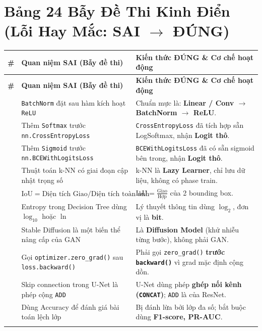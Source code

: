 \documentclass[10pt,a4paper]{article}
\begin{document}
\section{Bảng 24 Bẫy Đề Thi Kinh Điển (Lỗi Hay Mắc: SAI $\to$ ĐÚNG)}

\begin{xltabular}{\textwidth}{lp{6.2cm}X}
\toprule
\textbf{\#} & \textbf{Quan niệm SAI (Bẫy đề thi)} & \textbf{Kiến thức ĐÚNG \& Cơ chế hoạt động} \\
\midrule
\endfirsthead
\toprule
\textbf{\#} & \textbf{Quan niệm SAI (Bẫy đề thi)} & \textbf{Kiến thức ĐÚNG \& Cơ chế hoạt động} \\
\midrule
\endhead
\bottomrule
{} & \texttt{BatchNorm} đặt sau hàm kích hoạt \texttt{ReLU} & Chuẩn mực là: \textbf{Linear / Conv $\to$ BatchNorm $\to$ ReLU}. \\  & Thêm \texttt{Softmax} trước \texttt{nn.CrossEntropyLoss} & \texttt{CrossEntropyLoss} đã tích hợp sẵn LogSoftmax, nhận \textbf{Logit thô}. \\  & Thêm \texttt{Sigmoid} trước \texttt{nn.BCEWithLogitsLoss} & \texttt{BCEWithLogitsLoss} đã có sẵn sigmoid bên trong, nhận \textbf{Logit thô}. \\  & Thuật toán k-NN có giai đoạn cập nhật trọng số & k-NN là \textbf{Lazy Learner}, chỉ lưu dữ liệu, không có phase train. \\  & $\text{IoU} = \text{Diện tích Giao} / \text{Diện tích toàn ảnh}$ & $\text{IoU} = \frac{\text{Giao}}{\text{Hợp}}$ của 2 bounding box. \\  & Entropy trong Decision Tree dùng $\log_{10}$ hoặc $\ln$ & Lý thuyết thông tin dùng \textbf{$\log_2$}, đơn vị là \textbf{bit}. \\  & Stable Diffusion là một biến thể nâng cấp của GAN & Là \textbf{Diffusion Model} (khử nhiễu từng bước), không phải GAN. \\  & Gọi \texttt{optimizer.zero\_grad()} sau \texttt{loss.backward()} & Phải gọi \texttt{zero\_grad()} \textbf{trước \texttt{backward()}} vì grad mặc định cộng dồn. \\  & Skip connection trong U-Net là phép cộng \texttt{ADD} & U-Net dùng phép \textbf{ghép nối kênh (\texttt{CONCAT})}; \texttt{ADD} là của ResNet. \\  & Dùng Accuracy để đánh giá bài toán lệch lớp & Bị đánh lừa bởi lớp đa số; bắt buộc dùng \textbf{F1-score, PR-AUC}. \\ \addlinespace

\end{xltabular}
\end{document}
